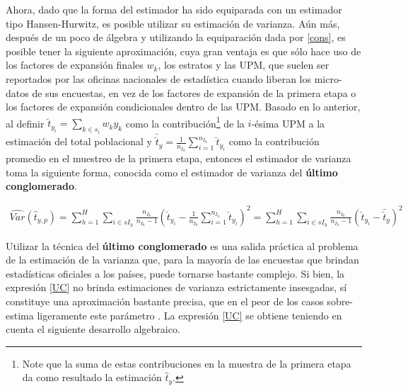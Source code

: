 \documentclass[12pt,spanish,]{book}
\let\rmarkdownfootnote\footnote%
\def\footnote{\protect\rmarkdownfootnote}
\begin{document}
Ahora, dado que la forma del estimador ha sido equiparada con un estimador tipo Hansen-Hurwitz, es posible utilizar su estimación de varianza. Aún más, después de un poco de álgebra y utilizando la equiparación dada por \eqref{cons}, es posible tener la siguiente aproximación, cuya gran ventaja es que sólo hace uso de los factores de expansión finales \(w_k\), los estratos y las UPM, que suelen ser reportados por las oficinas nacionales de estadística cuando liberan los micro-datos de sus encuestas, en vez de los factores de expansión de la primera etapa o los factores de expansión condicionales dentro de las UPM. Basado en lo anterior, al definir \(\breve{t}_{y_i} = \sum_{k \in s_i} w_k y_k\) como la contribución\footnote{Note que la suma de estas contribuciones en la muestra de la primera etapa da como resultado la estimación \(\hat{t}_y\).} de la \(i\)-ésima UPM a la estimación del total poblacional y \(\bar{\breve{t}}_{y}=\frac{1}{n_{I_h}}\sum_{i=1}^{n_{I_h}}\breve{t}_{y_i}\) como la contribución promedio en el muestreo de la primera etapa, entonces el estimador de varianza toma la siguiente forma, conocida como el estimador de varianza del \textbf{último conglomerado}.

\begin{align}
\label{UC}
\widehat{Var}(\hat{t}_{y,p})
=\sum_{h=1}^H \sum_{i \in sI_h}\frac{n_{I_h}}{n_{I_h}-1}\left( \breve{t}_{y_i} -\frac{1}{n_{I_h}}\sum_{i=1}^{n_{I_h}}\breve{t}_{y_i} \right)^2 
=\sum_{h=1}^H \sum_{i \in sI_h}\frac{n_{I_h}}{n_{I_h}-1}\left( \breve{t}_{y_i} - \bar{\breve{t}}_{y} \right)^2
\end{align}

Utilizar la técnica del \textbf{último conglomerado} es una salida práctica al problema de la estimación de la varianza que, para la mayoría de las encuestas que brindan estadísticas oficiales a los países, puede tornarse bastante complejo. Si bien, la expresión \eqref{UC} no brinda estimaciones de varianza estrictamente insesgadas, sí constituye una aproximación bastante precisa, que en el peor de los casos sobre-estima ligeramente este parámetro \autocite{Wolter_2007}. La expresión \eqref{UC} se obtiene teniendo en cuenta el siguiente desarrollo algebraico.
\end{document}
